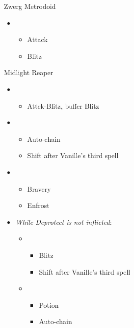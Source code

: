 \begin{multicols}{2}
  \begin{battle}[0:05]{Zwerg Metrodoid}
    \begin{itemize}
      \item \first
            \begin{itemize}
              \item Attack
              \item Blitz
            \end{itemize}
    \end{itemize}
  \end{battle}

  \begin{battle}[1:10]{Midlight Reaper}
    \begin{itemize}
      \item \first
            \begin{itemize}
              \item Attck-Blitz, buffer Blitz
            \end{itemize}
      \item \fifth
            \begin{itemize}
              \item Auto-chain
              \item Shift after Vanille's third spell
            \end{itemize}
      \item \third
            \begin{itemize}
              \item Bravery
              \item Enfrost
            \end{itemize}
      \item \textit{While Deprotect is not inflicted}:
            \begin{itemize}
              \item \sixth
                    \begin{itemize}
                      \item Blitz
                      \item Shift after Vanille's third spell
                    \end{itemize}
              \item \fifth
                    \begin{itemize}
                      \item Potion
                      \item Auto-chain

\end{itemize}
\end{itemize}
\end{itemize}
\end{battle}
\end{multicols}
